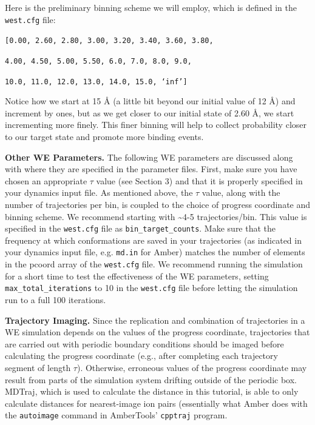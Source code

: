 \documentclass[9pt,tutorial,ASAPversion]{livecoms}
\begin{document}
Here is the preliminary binning scheme we will employ, which is defined in the \verb|west.cfg| file:
 
\verb|[0.00, 2.60, 2.80, 3.00, 3.20, 3.40, 3.60, 3.80,|

\verb|4.00, 4.50, 5.00, 5.50, 6.0, 7.0, 8.0, 9.0,|

\verb|10.0, 11.0, 12.0, 13.0, 14.0, 15.0, ‘inf’]|
        	 
Notice how we start at 15 \AA{} (a little bit beyond our initial value of 12 \AA) and increment by ones, but as we get closer to our initial state of 2.60 \AA, we start incrementing more finely. 
This finer binning will help to collect probability closer to our target state and promote more binding events.

\textbf{Other WE Parameters.} The following WE parameters are discussed along with where they are specified in the parameter files. 
First, make sure you have chosen an  appropriate $\tau$ value (see Section 3) and that it is properly specified in your dynamics input file. 
As mentioned above, the $\tau$ value, along with the number of trajectories per bin, is coupled to the choice of progress coordinate and binning scheme. 
We recommend starting with \textasciitilde 4-5 trajectories/bin. 
This value is specified in the \verb|west.cfg| file as \verb|bin_target_counts|. 
Make sure that the frequency at which conformations are saved in your trajectories (as indicated in your dynamics input file, e.g. \verb|md.in| for Amber) matches the number of elements in the pcoord array of the \verb|west.cfg| file. 
We recommend running the simulation for a short time to test the effectiveness of the WE parameters, setting \verb|max_total_iterations| to 10 in the \verb|west.cfg| file before letting the simulation run to a full 100 iterations.  

\textbf{Trajectory Imaging.} Since the replication and combination of trajectories in a WE simulation depends on the values of the progress coordinate, trajectories that are carried out with periodic boundary conditions should be imaged before calculating the progress coordinate (e.g., after completing each trajectory segment of length $\tau$). 
Otherwise, erroneous values of the progress coordinate may result from parts of the simulation system drifting outside of the periodic box. 
MDTraj, which is used to calculate the distance in this tutorial, is able to only calculate distances for nearest-image ion pairs (essentially what Amber does with the \verb|autoimage| command in AmberTools’ \verb|cpptraj| program.
\end{document}
